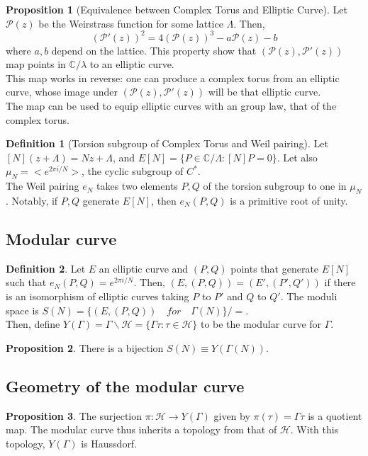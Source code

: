 \documentclass[11pt]{article}
\theoremstyle{definition}
\newtheorem{definition}{Definition}[section]
\theoremstyle{example}
\theoremstyle{lemma}
\theoremstyle{proposition}
\newtheorem{proposition}{Proposition}[section]
\theoremstyle{theorem}
\begin{document}
\begin{proposition}[Equivalence between Complex Torus and Elliptic Curve]
Let $\mathcal{P}(z)$ be the Weirstrass function for some lattice $\Lambda$. Then,
$$ (\mathcal{P}'(z))^2 = 4 (\mathcal{P}(z))^3 - a\mathcal{P}(z) - b$$
where $a,b$ depend on the lattice. This property show that $(\mathcal{P}(z), \mathcal{P}'(z))$ map points in $\mathbb{C}/\lambda$ to an elliptic curve.\\
This map works in reverse: one can produce a complex torus from an elliptic curve, whose image under $(\mathcal{P}(z), \mathcal{P}'(z))$ will be that elliptic curve.\\
The map can be used to equip elliptic curves with an group law, that of the complex torus.
\end{proposition}

\begin{definition}[Torsion subgroup of Complex Torus and Weil pairing]
Let $[N](z+\Lambda) = Nz + \Lambda$, and $E[N] = \{ P\in \mathbb{C}/\Lambda : [N]P = 0\}$. Let also $\mu_N = < e^{2\pi i/ N} >$, the cyclic subgroup of $C^*$.\\
The Weil pairing $e_N$ takes two elements $P,Q$ of the torsion subgroup to one in $\mu_N$. Notably, if $P,Q$ generate $E[N]$, then $e_N(P,Q)$ is a primitive root of unity.
\end{definition}

\subsection{Modular curve}
\begin{definition}
Let $E$ an elliptic curve and $(P,Q)$ points that generate $E[N]$ such that $e_N(P,Q) = e^{2\pi i /N}$. Then, $(E,(P,Q)) = (E', (P', Q'))$ if there is an isomorphism of elliptic curves taking $P$ to $P'$ and $Q$ to $Q'$. The moduli space is $S(N) = \{(E, (P,Q)) \quad for  \quad \Gamma(N)\} / =$.\\
Then, define $Y(\Gamma) = \Gamma \backslash \mathcal{H} = \{ \Gamma\tau : \tau \in \mathcal{H}\}$ to be the modular curve for $\Gamma$.
\end{definition}
\begin{proposition}
There is a bijection $S(N) \equiv Y(\Gamma(N))$.
\end{proposition}


\subsection{Geometry of the modular curve}
\begin{proposition}
The surjection $\pi : \mathcal{H} \to Y(\Gamma)$ given by $\pi(\tau) = \Gamma \tau$ is a quotient map. The modular curve thus inherits a topology from that of $\mathcal{H}$. With this topology, $Y(\Gamma)$ is Haussdorf.  
\end{proposition}
\end{document}
